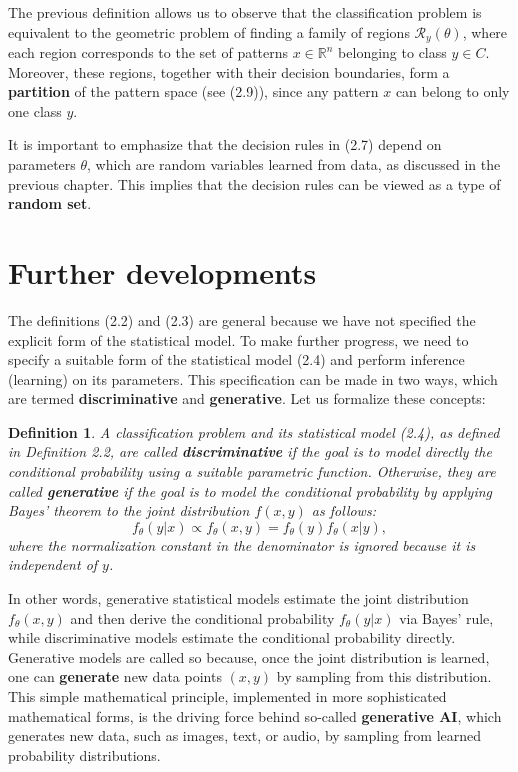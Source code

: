 \documentclass{report}
\newtheorem{definition}{Definition}[chapter]
\begin{document}
The previous definition allows us to observe that the classification problem is equivalent to the geometric problem of finding a family of regions $\mathcal{R}_y(\theta)$, where each region corresponds to the set of patterns $x \in \mathbb{R}^n$ belonging to class $y \in C$. Moreover, these regions, together with their decision boundaries, form a \textbf{partition} of the pattern space (see (2.9)), since any pattern $x$ can belong to only one class $y$.

It is important to emphasize that the decision rules in (2.7) depend on parameters $\theta$, which are random variables learned from data, as discussed in the previous chapter. This implies that the decision rules can be viewed as a type of \textbf{random set}.

\section{Further developments}
The definitions (2.2) and (2.3) are general because we have not specified the explicit form of the statistical model. To make further progress, we need to specify a suitable form of the statistical model (2.4) and perform inference (learning) on its parameters. This specification can be made in two ways, which are termed \textbf{discriminative} and \textbf{generative}. Let us formalize these concepts:

\begin{definition}
A classification problem and its statistical model (2.4), as defined in Definition 2.2, are called \textbf{discriminative} if the goal is to model directly the conditional probability using a suitable parametric function. Otherwise, they are called \textbf{generative} if the goal is to model the conditional probability by applying Bayes' theorem to the joint distribution $f(x,y)$ as follows:
\begin{equation}
f_\theta(y|x) \propto f_\theta(x,y) = f_\theta(y)f_\theta(x|y),
\end{equation}
where the normalization
constant in the denominator is ignored because it is independent of $y$.
\end{definition}

In other words, generative statistical models estimate the joint distribution $f_\theta(x,y)$ and then derive the conditional probability $f_\theta(y|x)$ via Bayes' rule, while discriminative models estimate the conditional probability directly. Generative models are called so because, once the joint distribution is learned, one can \textbf{generate} new data points $(x,y)$ by sampling from this distribution. This simple mathematical principle, implemented in more sophisticated mathematical forms, is the driving force behind so-called \textbf{generative AI}, which generates new data, such as images, text, or audio, by sampling from learned probability distributions.
\end{document}
